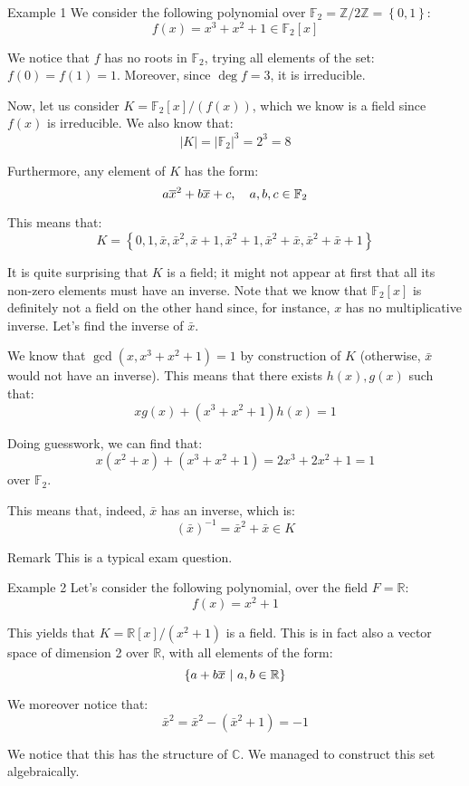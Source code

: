 \documentclass[a4paper]{article}
\begin{document}
\begin{parag}{Example 1}
    We consider the following polynomial over $\mathbb{F}_2 = \mathbb{Z}/2\mathbb{Z} = \left\{0, 1\right\}$: 
    \[f\left(x\right) = x^3 + x^2 + 1 \in \mathbb{F}_2\left[x\right]\]
    
    We notice that $f$ has no roots in $\mathbb{F}_2$, trying all elements of the set: $f\left(0\right) = f\left(1\right) = 1$. Moreover, since $\deg f = 3$, it is irreducible.

    Now, let us consider $K = \mathbb{F}_2\left[x\right] / \left(f\left(x\right)\right)$, which we know is a field since $f\left(x\right)$ is irreducible. We also know that: 
    \[\left|K\right| = \left|\mathbb{F}_2\right|^3 = 2^3 = 8\]
    
    Furthermore, any element of $K$ has the form: 
    \[a\overline{x}^2 + b \overline{x} + c, \quad a, b, c \in \mathbb{F}_2\]
    
    This means that: 
    \[K = \left\{0, 1, \bar{x}, \bar{x}^2, \bar{x} + 1, \bar{x}^2 + 1, \bar{x}^2 + \bar{x}, \bar{x}^2 + \bar{x} + 1\right\}\]
    
    It is quite surprising that $K$ is a field; it might not appear at first that all its non-zero elements must have an inverse. Note that we know that $\mathbb{F}_2\left[x\right]$ is definitely not a field on the other hand since, for instance, $x$ has no multiplicative inverse. Let's find the inverse of $\bar{x}$. 

    We know that $\gcd\left(x, x^3 + x^2 + 1\right) = 1$ by construction of $K$ (otherwise, $\bar{x}$ would not have an inverse). This means that there exists $h\left(x\right),  g\left(x\right)$ such that: 
    \[x g\left(x\right) + \left(x^3 + x^2 + 1\right)h\left(x\right) = 1\]
    
    Doing guesswork, we can find that: 
    \[x \left(x^2 + x\right) + \left(x^3 + x^2 + 1\right) = 2x^3 + 2x^2 + 1 = 1\]
    over $\mathbb{F}_2$.

    This means that, indeed, $\bar{x}$ has an inverse, which is: 
    \[\left(\bar{x}\right)^{-1} = \bar{x}^2 + \bar{x} \in K\]
    
    \begin{subparag}{Remark}
        This is a typical exam question.
    \end{subparag}
\end{parag}

\begin{parag}{Example 2}
    Let's consider the following polynomial, over the field $F = \mathbb{R}$: 
    \[f\left(x\right) = x^2 + 1\]
    
    This yields that $K = \mathbb{R}\left[x\right] / \left(x^2 + 1\right)$ is a field. This is in fact also a vector space of dimension 2 over $\mathbb{R}$, with all elements of the form: 
    \[\left\{a + b \bar{x} \suchthat a, b \in \mathbb{R}\right\}\]
    
    We moreover notice that: 
    \[\bar{x}^2 = \bar{x}^2 - \left(\bar{x}^2 + 1\right) = -1\]
    
    We notice that this has the structure of $\mathbb{C}$. We managed to construct this set algebraically.
\end{parag}
\end{document}
